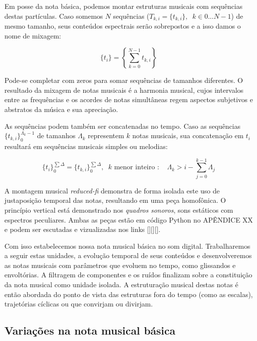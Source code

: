 Em posse da nota básica, podemos montar estruturas musicais com
sequências destas partículas. Caso somemos $N$ sequências ($T_{k,i}=\{t_{k,i}\}, \;\; k \in 0...N-1$) de mesmo tamanho, seus conteúdos espectrais serão sobrepostos e a isso damos o nome de mixagem:

\begin{equation}
\{t_i\}=\left \{ \sum_{k=0}^{N-1}t_{k,i} \right \}
\end{equation}

Pode-se completar com zeros para somar sequências de tamanhos diferentes. O resultado da mixagem de notas musicais é a harmonia musical, cujos intervalos entre as frequências e os acordes de notas simultâneas regem aspectos subjetivos e abstratos da música e sua apreciação.

As sequências podem também ser concatenadas no tempo. Caso as sequências $\{t_{k,i}\}_0^{\Lambda_k-1}$ de tamanhos $\Lambda_k$  representem $k$ notas musicais, sua concatenação em $t_i$ resultará em sequências musicais simples ou melodias:

\begin{equation}
\{t_i\}_0^{\sum\Delta}=\{t_{k,i}\}_0^{\sum\Delta}, \;\; k\text{ menor inteiro } : \quad \Lambda_k > i -\sum_{j=0}^{k-1}\Lambda_j
\end{equation}

A montagem musical \emph{reduced-fi} demonstra de forma isolada este uso de justaposição temporal das notas, resultando em uma peça homofônica. O princípio vertical está demonstrado nos \emph{quadros sonoros}, sons estáticos com espectros peculiares. Ambas as peças estão em código Python no APÊNDICE XX e podem ser escutadas e vizualizadas nos links [][][].

Com isso estabelecemos nossa nota musical básica no som digital. Trabalharemos a seguir estas unidades, a evolução temporal de seus conteúdos e desenvolveremos as notas musicais com parâmetros que evoluem no tempo, como glissandos e envoltórias. 
A filtragem de componentes e os ruídos finalizam sobre a constituição da nota musical como unidade isolada. A estruturação musical destas notas é então abordada do ponto de vista das estruturas fora do tempo (como as escalas), trajetórias cíclicas ou que convirjam ou divirjam.

\clearpage

\subsection{Variações na nota musical básica}


